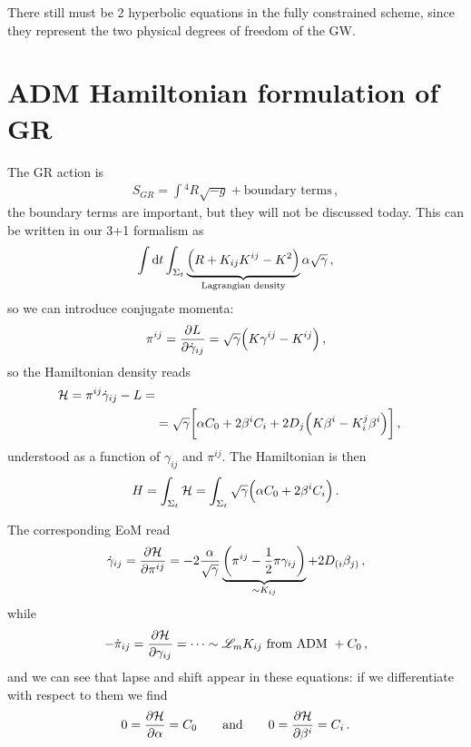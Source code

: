 \documentclass[main.tex]{subfiles}
\begin{document}
There still must be 2 hyperbolic equations in the fully constrained scheme, since they represent the two physical degrees of freedom of the GW. 


\section{ADM Hamiltonian formulation of GR}

The GR action is 
%
\begin{align}
S_{GR} = \int {}^4R \sqrt{-g} + \text{boundary terms}
\,,
\end{align}
%
the boundary terms are important, but they will not be discussed today. 
This can be written in our 3+1 formalism as 
%
\begin{align}
\int \dd{t} \int_{\Sigma _t} \underbrace{\qty(R + K_{ij} K^{ij} - K^2)}_{\text{Lagrangian density}} \alpha \sqrt{\gamma }
\,,
\end{align}
%
so we can introduce conjugate momenta: 
%
\begin{align}
\pi^{ij} = \pdv{L}{\dot{\gamma}_{ij}} = \sqrt{\gamma } \qty(K \gamma^{ij} - K^{ij})
\,,
\end{align}
%
so the Hamiltonian density reads 
%
\begin{align}
\mathcal{H} =\pi^{ij} \dot{\gamma}_{ij} - L =  \\
&= \sqrt{\gamma } \qty[ \alpha C_0 + 2 \beta^{i} C_i + 2 D_j \qty(K \beta^{i} - K^{j}_{i} \beta^{i})]
\,,
\end{align}
%
understood as a function of \(\gamma_{ij}\) and \(\pi^{ij}\). The Hamiltonian is then 
%
\begin{align}
H = \int_{\Sigma_t} \mathcal{H} = \int_{\Sigma _t} \sqrt{\gamma }
\qty(\alpha C_0  + 2 \beta^{i} C_i) 
\,.
\end{align}

The corresponding EoM read 
%
\begin{align}
\dot{\gamma}_{ij} = \pdv{\mathcal{H}}{\pi^{ij}} = - 2 \frac{\alpha}{\sqrt{\gamma }} \underbrace{\qty(\pi^{ij} - \frac{1}{2} \pi \gamma_{ij})}_{\sim K_{ij}} + 2 D_{(i } \beta_{j)}
\,,
\end{align}
%
while 
%
\begin{align}
- \dot{\pi}_{ij} = \pdv{\mathcal{H}}{\gamma_{ij}} = \dots 
\sim \mathscr{L}_m K_{ij} \text{ from ADM } + C_0  
\,,
\end{align}
%
and we can see that lapse and shift appear in these equations: if we differentiate with respect to them we find 
%
\begin{align}
0 = \pdv{\mathcal{H}}{\alpha } = C_0  
\qquad \text{and} \qquad
0 = \pdv{\mathcal{H}}{\beta^{i}} = C_i
\,.
\end{align}
\end{document}
